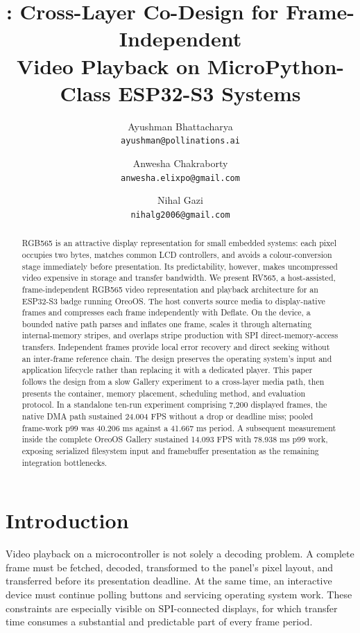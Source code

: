 \documentclass[11pt,twocolumn]{article}
\title{\system: Cross-Layer Co-Design for Frame-Independent\\
Video Playback on MicroPython-Class ESP32-S3 Systems}
\author{Ayushman Bhattacharya\\
\texttt{ayushman@pollinations.ai}
\and
Anwesha Chakraborty\\
\texttt{anwesha.elixpo@gmail.com}
\and
Nihal Gazi\\
\texttt{nihalg2006@gmail.com}}
\date{}
\newcommand{\system}{RV565}
\begin{document}
\maketitle

\begin{abstract}
RGB565 is an attractive display representation for small embedded systems:
each pixel occupies two bytes, matches common LCD controllers, and avoids a
colour-conversion stage immediately before presentation.  Its predictability,
however, makes uncompressed video expensive in storage and transfer bandwidth.
We present \system, a host-assisted, frame-independent RGB565 video
representation and playback architecture for an ESP32-S3 badge running
OreoOS.  The host converts source media to display-native frames and compresses
each frame independently with Deflate.  On the device, a bounded native path
parses and inflates one frame, scales it through alternating internal-memory
stripes, and overlaps stripe production with SPI direct-memory-access
transfers.  Independent frames provide local error recovery and direct seeking
without an inter-frame reference chain.  The design preserves the operating
system's input and application lifecycle rather than replacing it with a
dedicated player.  This paper follows the design from a slow Gallery
experiment to a cross-layer media path, then presents the container, memory
placement, scheduling method, and evaluation protocol.  In a standalone
ten-run experiment comprising 7,200 displayed frames, the native DMA path
sustained 24.004 FPS without a drop or deadline miss; pooled frame-work p99 was
40.206 ms against a 41.667 ms period.  A subsequent measurement inside the
complete OreoOS Gallery sustained 14.093 FPS with 78.938 ms p99 work, exposing
serialized filesystem input and framebuffer presentation as the remaining
integration bottlenecks.
\end{abstract}

\section{Introduction}

Video playback on a microcontroller is not solely a decoding problem.  A
complete frame must be fetched, decoded, transformed to the panel's pixel
layout, and transferred before its presentation deadline.  At the same time,
an interactive device must continue polling buttons and servicing operating
system work.  These constraints are especially visible on SPI-connected
displays, for which transfer time consumes a substantial and predictable part
of every frame period.
\end{document}
